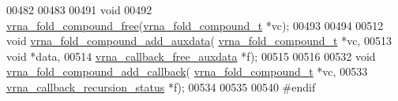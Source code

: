 \begin{DoxyCode}
00482 
00483 
00491 \textcolor{keywordtype}{void}
00492 \mbox{\hyperlink{group__fold__compound_gadded6039d63f5d6509836e20321534ad}{vrna\_fold\_compound\_free}}(\mbox{\hyperlink{group__fold__compound_structvrna__fc__s}{vrna\_fold\_compound\_t}} *vc);
00493 
00494 
00512 \textcolor{keywordtype}{void} \mbox{\hyperlink{group__fold__compound_ga6316a9426bea2f742375e8df6febd3f6}{vrna\_fold\_compound\_add\_auxdata}}(
      \mbox{\hyperlink{group__fold__compound_structvrna__fc__s}{vrna\_fold\_compound\_t}}        *vc,
00513                                     \textcolor{keywordtype}{void}                        *data,
00514                                     \mbox{\hyperlink{group__fold__compound_ga7806651f51b195013839a218b3bbd5a3}{vrna\_callback\_free\_auxdata}}  *f);
00515 
00516 
00532 \textcolor{keywordtype}{void} \mbox{\hyperlink{group__fold__compound_ga097ed6133055624667cbce8cfdebf82d}{vrna\_fold\_compound\_add\_callback}}(
      \mbox{\hyperlink{group__fold__compound_structvrna__fc__s}{vrna\_fold\_compound\_t}}           *vc,
00533                                      \mbox{\hyperlink{group__fold__compound_gac86036fa8cad1108832335063243cdc8}{vrna\_callback\_recursion\_status}} *f);
00534 
00535 
00540 \textcolor{preprocessor}{#endif}
\end{DoxyCode}
